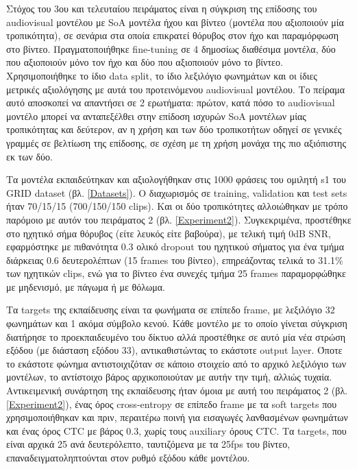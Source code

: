 Στόχος του 3ου και τελευταίου πειράματος είναι η σύγκριση της επίδοσης του audiovisual μοντέλου με SoA μοντέλα ήχου και βίντεο (μοντέλα που αξιοποιούν μία τροπικότητα), σε σενάρια στα οποία επικρατεί θόρυβος στον ήχο και παραμόρφωση στο βίντεο. Πραγματοποιήθηκε fine-tuning σε 4 δημοσίως διαθέσιμα μοντέλα, δύο που αξιοποιούν μόνο τον ήχο και δύο που αξιοποιούν μόνο το βίντεο. Χρησιμοποιήθηκε το ίδιο data split, το ίδιο λεξιλόγιο φωνημάτων και οι ίδιες μετρικές αξιολόγησης με αυτά του προτεινόμενου audiovisual μοντέλου. Το πείραμα αυτό αποσκοπεί να απαντήσει σε 2 ερωτήματα: πρώτον, κατά πόσο το audiovisual μοντέλο μπορεί να ανταπεξέλθει στην επίδοση ισχυρών SoA μοντέλων μίας τροπικότητας και δεύτερον, αν η χρήση και των δύο τροπικοτήτων οδηγεί σε γενικές γραμμές σε βελτίωση της επίδοσης, σε σχέση με τη χρήση μονάχα της πιο αξιόπιστης εκ των δύο.

Τα μοντέλα εκπαιδεύτηκαν και αξιολογήθηκαν στις 1000 φράσεις του ομιλητή s1 του GRID dataset (βλ. \ref{Datasets}). Ο διαχωρισμός σε training, validation και test sets ήταν 70/15/15 (700/150/150 clips). Και οι δύο τροπικότητες αλλοιώθηκαν με τρόπο παρόμοιο με αυτόν του πειράματος 2 (βλ. \ref{Experiment2}). Συγκεκριμένα, προστέθηκε στο ηχητικό σήμα θόρυβος (είτε λευκός είτε βαβούρα), με τελική τιμή 0dB SNR, εφαρμόστηκε με πιθανότητα 0.3 ολικό dropout του ηχητικού σήματος για ένα τμήμα διάρκειας 0.6 δευτερολέπτων (15 frames του βίντεο), επηρεάζοντας τελικά το 31.1\% των ηχητικών clips, ενώ για το βίντεο ένα συνεχές τμήμα 25 frames παραμορφώθηκε με μηδενισμό, με πάγωμα ή με θόλωμα.

Τα targets της εκπαίδευσης είναι τα φωνήματα σε επίπεδο frame, με λεξιλόγιο 32 φωνημάτων και 1 ακόμα σύμβολο κενού. Κάθε μοντέλο με το οποίο γίνεται σύγκριση διατήρησε το προεκπαιδευμένο του δίκτυο αλλά προστέθηκε σε αυτό μία νέα στρώση εξόδου (με διάσταση εξόδου 33), αντικαθιστώντας το εκάστοτε output layer. Όποτε το εκάστοτε φώνημα αντιστοιχιζόταν σε κάποιο στοιχείο από το αρχικό λεξιλόγιο των μοντέλων, το αντίστοιχο βάρος αρχικοποιούταν με αυτήν την τιμή, αλλιώς τυχαία. Αντικειμενική συνάρτηση της εκπαίδευσης ήταν όμοια με αυτή του πειράματος 2 (βλ. \ref{Experiment2}), ένας όρος cross-entropy σε επίπεδο frame με τα soft targets που χρησιμοποιήθηκαν και πριν, περαιτέρω ποινή για εισαγωγές λανθασμένων φωνημάτων και ένας όρος CTC με βάρος 0.3, χωρίς τους auxiliary όρους CTC. Τα targets, που είναι αρχικά 25 ανά δευτερόλεπτο, ταυτιζόμενα με τα 25fps του βίντεο, επαναδειγματοληπτούνται στον ρυθμό εξόδου κάθε μοντέλου.


